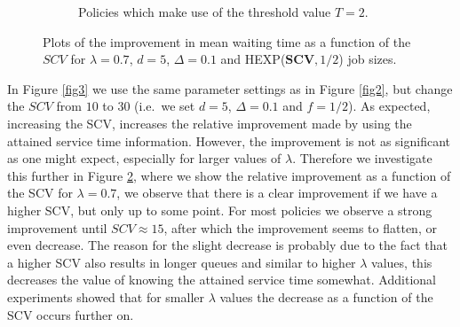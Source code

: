 \documentclass[12pt]{report}
\begin{document}
\begin{figure}[t]
\begin{center}
\begin{subfigure}{.43\textwidth}
\caption{Policies which make use of the threshold value $T=2$.}
\label{fig4b}
\end{subfigure}
\caption{Plots of the improvement in mean waiting time as a function of the $SCV$ for 
$\lambda=0.7$, $d=5$, $\Delta=0.1$ and HEXP($\textbf{SCV},1/2$) job sizes.}
\label{fig4}
\end{center}
\end{figure}
In Figure \ref{fig3} we use the same parameter settings as in Figure \ref{fig2}, but change the $SCV$ from $10$ to $30$ (i.e.~we set $d=5$, $\Delta=0.1$ and $f=1/2$). As expected, increasing the SCV, increases the relative improvement made by using the attained service time information. However, the improvement is not as significant as one might expect, especially for larger values of $\lambda$. Therefore we investigate this further in Figure \ref{fig4}, where we show the relative improvement as a function of the SCV for $\lambda=0.7$, we observe that there is a clear improvement if we have a higher SCV, but only up to some point. For most policies we observe a strong improvement until $SCV \approx 15$, after which the improvement seems to flatten, or even decrease. The reason for the slight decrease is probably due to the fact that a higher SCV
also results in longer queues and similar to higher $\lambda$ values, this decreases the value
of knowing the attained service time somewhat. Additional experiments showed that for smaller $\lambda$ values the decrease as a function of the SCV occurs further on.
\end{document}

